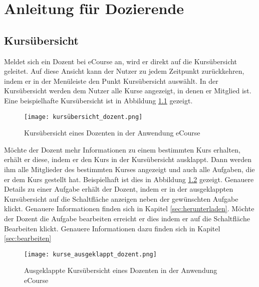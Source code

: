 
\chapter{Anleitung für Dozierende}
\label{sec:chap2}

\section{Kursübersicht}
Meldet sich ein Dozent bei eCourse an, wird er direkt auf die Kursübersicht geleitet. Auf diese Ansicht kann der Nutzer zu jedem Zeitpunkt zurückkehren, indem er in der Menüleiste den Punkt \glqq Kursübersicht \grqq{} auswählt. In der Kursübersicht werden dem Nutzer alle Kurse angezeigt, in denen er Mitglied ist. Eine beispielhafte Kursübersicht ist in Abbildung \ref{fib:kursübersicht_dozent} gezeigt.

\begin{figure}[h]
\centering
\texttt{[image: kursübersicht\_dozent.png]}
\caption{Kursübersicht eines Dozenten in der Anwendung eCourse}
\label{fib:kursübersicht_dozent}
\end{figure}

Möchte der Dozent mehr Informationen zu einem bestimmten Kurs erhalten, erhält er diese, indem er den Kurs in der Kursübersicht ausklappt. Dann werden ihm alle Mitglieder des bestimmten Kurses angezeigt und auch alle Aufgaben, die er dem Kurs gestellt hat. Beispielhaft ist dies in Abbildung \ref{fib:kursübersicht_dozent_ausgeklappt} gezeigt. Genauere Details zu einer Aufgabe erhält der Dozent, indem er in der ausgeklappten Kursübersicht auf die Schaltfläche \glqq anzeigen\grqq{} neben der gewünschten Aufgabe klickt. Genauere Informationen finden sich in Kapitel \ref{sec:herunterladen}. Möchte der Dozent die Aufgabe bearbeiten erreicht er dies indem er auf die Schaltfläche \glqq Bearbeiten\grqq{} klickt. Genauere Informationen dazu finden sich in Kapitel \ref{sec:bearbeiten}
 
\begin{figure}[h]
\centering
\texttt{[image: kurse\_ausgeklappt\_dozent.png]}
\caption{Ausgeklappte Kursübersicht eines Dozenten in der Anwendung eCourse}
\label{fib:kursübersicht_dozent_ausgeklappt}
\end{figure}

